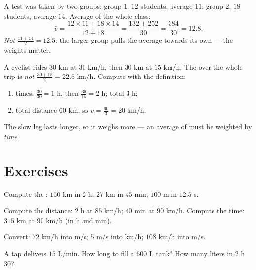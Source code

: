 \begin{example}\label{ex:g8:speed:average}
A test was taken by two groups: group 1, $12$ students, average
$11$; group 2, $18$ students, average $14$. Average of the whole
class:
\[
\bar v = \frac{12 \times 11 + 18 \times 14}{12 + 18}
= \frac{132 + 252}{30} = \frac{384}{30} = 12.8 .
\]
\emph{Not} $\frac{11 + 14}{2} = 12.5$: the larger group pulls the
average towards its own — the weights matter.
\end{example}

\begin{example}\label{ex:g8:speed:twolegs}
A cyclist rides $30$ km at $30$ km/h, then $30$ km at $15$ km/h. The
 over the whole trip is \emph{not}
$\frac{30 + 15}{2} = 22.5$ km/h. Compute with the definition:
\begin{enumerate}
  \item times: $\frac{30}{30} = 1$ h, then $\frac{30}{15} = 2$ h;
        total $3$ h;
  \item total distance $60$ km, so
        $v = \frac{60}{3} = 20$ km/h.
\end{enumerate}
The slow leg lasts longer, so it weighs more --- an average of 
must be weighted by \emph{time}.
\end{example}

\section{Exercises}

\begin{exercise}[$\star$]\label{exo:g8:speed:1}
Compute the : $150$ km in $2$ h; $27$ km in $45$ min;
$100$ m in $12.5$ s.
\end{exercise}

\begin{exercise}[$\star$]\label{exo:g8:speed:2}
Compute the distance: $2$ h at $85$ km/h; $40$ min at $90$ km/h.
Compute the time: $315$ km at $90$ km/h (in h and min).
\end{exercise}

\begin{exercise}[$\star$]\label{exo:g8:speed:3}
Convert: $72$ km/h into m/s; $5$ m/s into km/h; $108$ km/h into m/s.
\end{exercise}

\begin{exercise}[$\star$]\label{exo:g8:speed:4}
A tap delivers $15$ L/min. How long to fill a $600$ L tank? How many
liters in $2$ h $30$?
\end{exercise}

